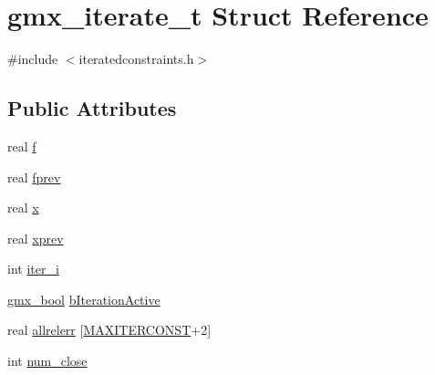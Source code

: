\hypertarget{structgmx__iterate__t}{\section{gmx\-\_\-iterate\-\_\-t \-Struct \-Reference}
\label{structgmx__iterate__t}
}


{\ttfamily \#include $<$iteratedconstraints.\-h$>$}

\subsection*{\-Public \-Attributes}
\begin{DoxyCompactItemize}
\item 
real \hyperlink{structgmx__iterate__t_aee8facfc5853f9c81c57bea152fd1847}{f}
\item 
real \hyperlink{structgmx__iterate__t_a4bc373e4979757f3471b05bd3c2f8627}{fprev}
\item 
real \hyperlink{structgmx__iterate__t_af69ba7e581ac4256c9191e09bde041cd}{x}
\item 
real \hyperlink{structgmx__iterate__t_a2deb847ae37d581dbe6527d52d2ddc06}{xprev}
\item 
int \hyperlink{structgmx__iterate__t_a05b50eeb5cf95e1e403fcbfed87ac65a}{iter\-\_\-i}
\item 
\hyperlink{include_2types_2simple_8h_a8fddad319f226e856400d190198d5151}{gmx\-\_\-bool} \hyperlink{structgmx__iterate__t_a53d6320278da52a52b7aef07a7bfdaa3}{b\-Iteration\-Active}
\item 
real \hyperlink{structgmx__iterate__t_a3cc926b6b2ec1b040cda0e2d71cca01a}{allrelerr} \mbox{[}\hyperlink{share_2template_2gromacs_2types_2iteratedconstraints_8h_abb6aec33e26c401a681b8314102f6981}{\-M\-A\-X\-I\-T\-E\-R\-C\-O\-N\-S\-T}+2\mbox{]}
\item 
int \hyperlink{structgmx__iterate__t_afa2682bbd3711fc9f0630efb651f5de2}{num\-\_\-close}
\end{DoxyCompactItemize}


